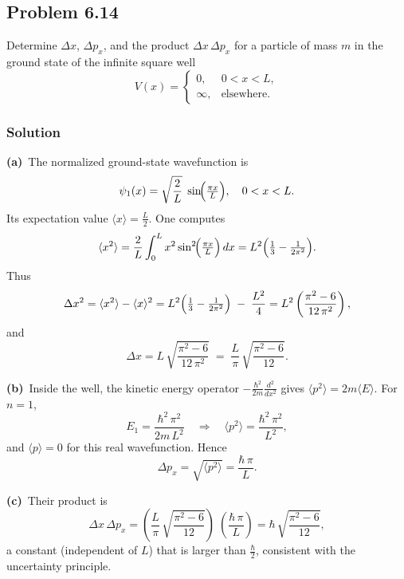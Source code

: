 \documentclass[twocolumn]{article}
\begin{document}
\begin{spacing}{1}
\subsection{Problem 6.14}
Determine $\Delta x$, $\Delta p_x$, and the product $\Delta x\,\Delta p_x$ for a particle of mass $m$ in the ground state of the infinite square well
\[
V(x) = 
\begin{cases}
0, & 0<x<L,\\
\infty, & \text{elsewhere}.
\end{cases}
\]

\subsubsection*{Solution}
\textbf{(a)}~The normalized ground-state wavefunction is
\[
\psi_1(x) 
= \sqrt{\frac{2}{L}}\;\sin\!\Bigl(\tfrac{\pi x}{L}\Bigr),
\quad
0<x<L.
\]
Its expectation value $\langle x\rangle = \tfrac{L}{2}$. One computes
\[
\langle x^2\rangle 
= \frac{2}{L}\int_{0}^{L} x^2 \sin^2\!\Bigl(\tfrac{\pi x}{L}\Bigr)\,dx
= L^2\Bigl(\tfrac{1}{3} - \tfrac{1}{2\pi^2}\Bigr).
\]
Thus
\[
\Delta x^2
= \langle x^2\rangle - \langle x\rangle^2
= L^2\Bigl(\tfrac{1}{3} - \tfrac{1}{2\pi^2}\Bigr)
\;-\;
\frac{L^2}{4}
= L^2\left(\frac{\pi^2 - 6}{12\,\pi^2}\right),
\]
and
\[
\Delta x 
= L\,\sqrt{\frac{\pi^2 - 6}{12\,\pi^2}}
\;=\;\frac{L}{\pi}\,\sqrt{\frac{\pi^2 - 6}{12}}.
\]

\noindent
\textbf{(b)}~Inside the well, the kinetic energy operator $-\tfrac{\hbar^2}{2m}\tfrac{d^2}{dx^2}$ gives 
\(\langle p^2\rangle = 2m\langle E\rangle\). 
For $n=1$,
\[
E_1
= \frac{\hbar^2\,\pi^2}{2m\,L^2}
\quad\Longrightarrow\quad
\langle p^2\rangle 
= \frac{\hbar^2\,\pi^2}{L^2},
\]
and $\langle p\rangle=0$ for this real wavefunction. Hence
\[
\Delta p_x
= \sqrt{\langle p^2\rangle}
= \frac{\hbar\,\pi}{L}.
\]

\noindent
\textbf{(c)}~Their product is
\[
\Delta x\,\Delta p_x
= \left(\frac{L}{\pi}\,\sqrt{\frac{\pi^2 - 6}{12}}\right)
\;\left(\frac{\hbar\,\pi}{L}\right)
= \hbar\,\sqrt{\frac{\pi^2 - 6}{12}},
\]
a constant (independent of $L$) that is larger than $\tfrac{\hbar}{2}$, consistent with the uncertainty principle.



\end{spacing}
\end{document}
